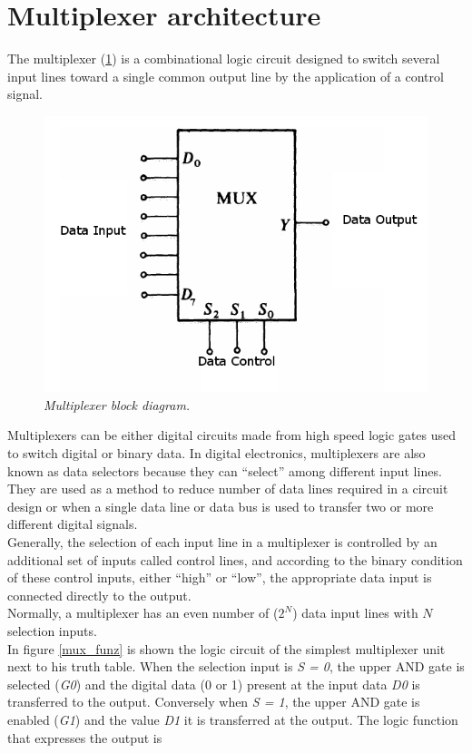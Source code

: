 \section{Multiplexer architecture}
The multiplexer (\ref{mux_blocchi}) is a combinational logic circuit designed to switch several input lines toward a single common output line by the application of a control signal.\\
\begin{figure}[!h]
	\centering
	\includegraphics[scale=0.5]{immagini/mux_blocchi.png}
	\caption{\textit{Multiplexer block diagram.}} 
	\label{mux_blocchi}
\end{figure}
\newline
Multiplexers can be either digital circuits made from high speed logic gates used to switch digital or binary data.
In digital electronics, multiplexers are also known as data selectors because they can “select” among different input lines.
They are used as a method to reduce number of data lines required in a circuit design or when a single data line or data bus is used to transfer two or more different digital signals.\\
Generally, the selection of each input line in a multiplexer is controlled by an additional set of inputs called control lines, and according to the binary condition of these control inputs, either “high” or “low”, the appropriate data input is connected directly to the output.\\
Normally, a multiplexer has an even number of ($2^N$) data input lines with $N$ selection inputs.\\
In figure \ref{mux_funz} is shown the logic circuit of the simplest multiplexer unit next to his truth table. When the selection input is \textit{S = 0}, the upper AND gate is selected (\textit{G0}) and the digital data (0 or 1) present at the input data \textit{D0} is transferred to the output. Conversely when \textit{S = 1}, the upper AND gate is enabled (\textit{G1}) and the value \textit{D1} it is transferred at the output. The logic function that expresses the output is
